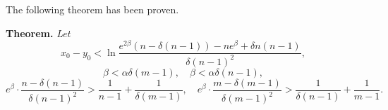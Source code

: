 The following theorem has been proven.

\bigskip

\textbf{Theorem.}
\textit{Let}
%
\begin{equation}
	\label{eq:intro:constraint_1}
	x_0 - y_0 < \ln \dfrac{e^{2\beta}(n - \delta(n - 1)) - ne^{\beta} + \delta n(n - 1)}{\delta (n - 1)^2},
\end{equation}
\begin{equation}
	\label{eq:intro:constraint_2}
	\beta < \alpha \delta (m - 1), \quad \beta < \alpha \delta (n - 1),
\end{equation}
\small
\begin{equation}
	\label{eq:intro:constraint_3}
	e^{\beta} \cdot \dfrac{n - \delta(n - 1)}{\delta (n - 1)^2} > \dfrac{1}{n - 1} + \dfrac{1}{\delta(m - 1)}, \quad
	e^{\beta} \cdot \dfrac{m - \delta(m - 1)}{\delta (m - 1)^2} > \dfrac{1}{\delta(n - 1)} + \dfrac{1}{m - 1}.
\end{equation}
\normalsize

